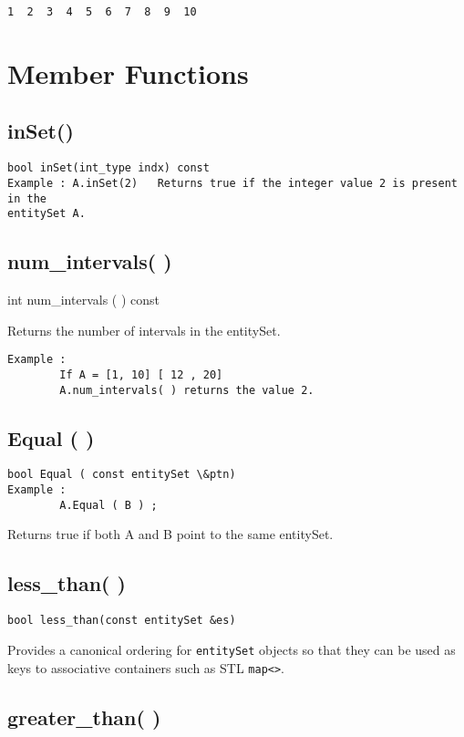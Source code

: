 \documentclass[letterpaper,12pt]{article}
\begin{document}
\begin{verbatim}
1  2  3  4  5  6  7  8  9  10  
\end{verbatim}


\section*{Member Functions}

\subsection{inSet()}
\begin{verbatim}
bool inSet(int_type indx) const 
Example : A.inSet(2)   Returns true if the integer value 2 is present in the 
entitySet A.
\end{verbatim}

\subsection{num\_intervals( )}

int num\_intervals ( ) const

Returns the number of intervals in the entitySet.
\begin{verbatim}
Example : 
        If A = [1, 10] [ 12 , 20]
        A.num_intervals( ) returns the value 2.
\end{verbatim}

\subsection{Equal ( )}
\begin{verbatim}
bool Equal ( const entitySet \&ptn)
Example :
        A.Equal ( B ) ;
\end{verbatim}

Returns true if both A and B point to the same entitySet. 

\subsection{less\_than( )}

\begin{verbatim}
bool less_than(const entitySet &es)
\end{verbatim}

Provides a canonical ordering for {\tt entitySet} objects so that they can be 
used as keys to associative containers such as STL {\tt map<>}.

\subsection{greater\_than( )}
 
\end{document}
